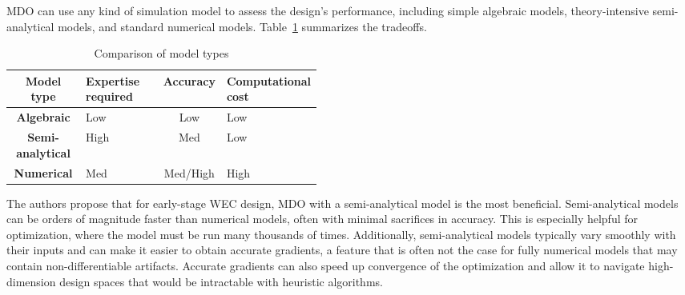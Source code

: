 

MDO can use any kind of simulation model to assess the design's performance, including simple algebraic models, theory-intensive semi-analytical models, and standard numerical models. Table~\ref{tab:model-types} summarizes the tradeoffs.
\begin{table}
    \centering
    \begin{tabular}{c>{\centering\arraybackslash}p{0.25\linewidth}c>{\centering\arraybackslash}p{0.2\linewidth}} 
         \textbf{Model type}&  \textbf{Expertise required}&  \textbf{Accuracy}&  \textbf{Computational cost}\\ \hline
         \textbf{Algebraic}&  Low&  Low&  Low\\ 
         \textbf{Semi-analytical}&  High&  Med&  Low\\ 
         \textbf{Numerical}&  Med&  Med/High&  High\\ 
    \end{tabular}
    \caption{Comparison of model types}
    \label{tab:model-types}
\end{table}
The authors propose that for early-stage WEC design, MDO with a semi-analytical model is the most beneficial. Semi-analytical models can be orders of magnitude faster than numerical models, often with minimal sacrifices in accuracy. This is especially helpful for optimization, where the model must be run many thousands of times. Additionally, semi-analytical models typically vary smoothly with their inputs and can make it easier to obtain accurate gradients, a feature that is often not the case for fully numerical models that may contain non-differentiable artifacts. Accurate gradients can also speed up convergence of the optimization and allow it to navigate high-dimension design spaces that would be intractable with heuristic algorithms.

